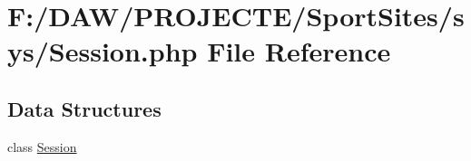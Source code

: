 \hypertarget{_session_8php}{}\section{F\+:/\+D\+A\+W/\+P\+R\+O\+J\+E\+C\+T\+E/\+Sport\+Sites/sys/\+Session.php File Reference}
\label{_session_8php}
\subsection*{Data Structures}
\begin{DoxyCompactItemize}
\item 
class \hyperlink{class_session}{Session}
\end{DoxyCompactItemize}
